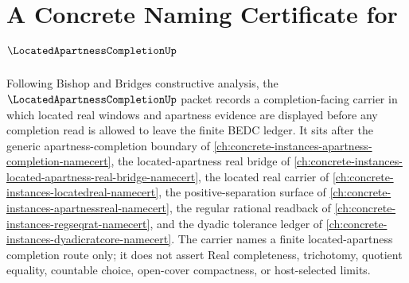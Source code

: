 \chapter{A Concrete Naming Certificate for $\LocatedApartnessCompletionUp$}
\label{ch:concrete-instances-located-apartness-completion-namecert}

Following Bishop and Bridges constructive analysis, the $\LocatedApartnessCompletionUp$ packet records a completion-facing carrier in which located real windows and apartness evidence are displayed before any completion read is allowed to leave the finite BEDC ledger. It sits after the generic apartness-completion boundary of \autoref{ch:concrete-instances-apartness-completion-namecert}, the located-apartness real bridge of \autoref{ch:concrete-instances-located-apartness-real-bridge-namecert}, the located real carrier of \autoref{ch:concrete-instances-locatedreal-namecert}, the positive-separation surface of \autoref{ch:concrete-instances-apartnessreal-namecert}, the regular rational readback of \autoref{ch:concrete-instances-regseqrat-namecert}, and the dyadic tolerance ledger of \autoref{ch:concrete-instances-dyadicratcore-namecert}. The carrier names a finite located-apartness completion route only; it does not assert Real completeness, trichotomy, quotient equality, countable choice, open-cover compactness, or host-selected limits.

